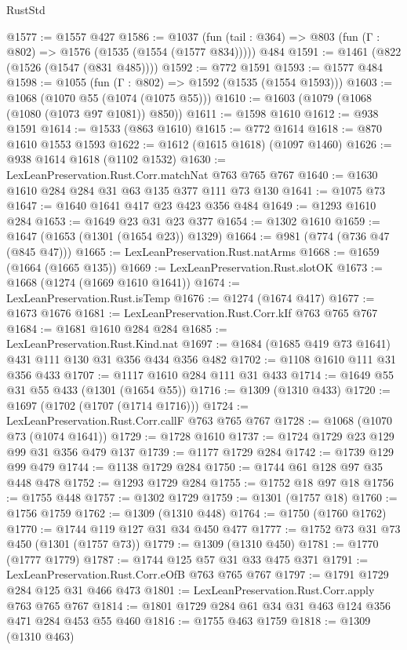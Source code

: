 \begin{lexlean}{RustStd}
\begin{coremodule}
@1577 := @1557 @427
@1586 := @1037
    (fun (tail : @364) => @803 (fun (Γ : @802) => @1576 (@1535 (@1554 (@1577 @834)))))
    @484
@1591 := @1461 (@822 (@1526 (@1547 (@831 @485))))
@1592 := @772 @1591
@1593 := @1577 @484
@1598 := @1055 (fun (Γ : @802) => @1592 (@1535 (@1554 @1593)))
@1603 := @1068 (@1070 @55 (@1074 (@1075 @55)))
@1610 := @1603 (@1079 (@1068 (@1080 (@1073 @97 @1081)) @850))
@1611 := @1598 @1610
@1612 := @938 @1591
@1614 := @1533 (@863 @1610)
@1615 := @772 @1614
@1618 := @870 @1610 @1553 @1593
@1622 := @1612 (@1615 @1618) (@1097 @1460)
@1626 := @938 @1614 @1618 (@1102 @1532)
@1630 := LexLeanPreservation.Rust.Corr.matchNat @763 @765 @767
@1640 := @1630 @1610 @284 @284 @31 @63 @135 @377 @111 @73 @130
@1641 := @1075 @73
@1647 := @1640 @1641 @417 @23 @423 @356 @484
@1649 := @1293 @1610 @284
@1653 := @1649 @23 @31 @23 @377
@1654 := @1302 @1610
@1659 := @1647 (@1653 (@1301 (@1654 @23)) @1329)
@1664 := @981 (@774 (@736 @47 (@845 @47)))
@1665 := LexLeanPreservation.Rust.natArms
@1668 := @1659 (@1664 (@1665 @135))
@1669 := LexLeanPreservation.Rust.slotOK
@1673 := @1668 (@1274 (@1669 @1610 @1641))
@1674 := LexLeanPreservation.Rust.isTemp
@1676 := @1274 (@1674 @417)
@1677 := @1673 @1676
@1681 := LexLeanPreservation.Rust.Corr.kIf @763 @765 @767
@1684 := @1681 @1610 @284 @284
@1685 := LexLeanPreservation.Rust.Kind.nat
@1697 := @1684 (@1685 @419 @73 @1641) @431 @111 @130 @31 @356 @434 @356 @482
@1702 := @1108 @1610 @111 @31 @356 @433
@1707 := @1117 @1610 @284 @111 @31 @433
@1714 := @1649 @55 @31 @55 @433 (@1301 (@1654 @55))
@1716 := @1309 (@1310 @433)
@1720 := @1697 (@1702 (@1707 (@1714 @1716)))
@1724 := LexLeanPreservation.Rust.Corr.callF @763 @765 @767
@1728 := @1068 (@1070 @73 (@1074 @1641))
@1729 := @1728 @1610
@1737 := @1724 @1729 @23 @129 @99 @31 @356 @479 @137
@1739 := @1177 @1729 @284
@1742 := @1739 @129 @99 @479
@1744 := @1138 @1729 @284
@1750 := @1744 @61 @128 @97 @35 @448 @478
@1752 := @1293 @1729 @284
@1755 := @1752 @18 @97 @18
@1756 := @1755 @448
@1757 := @1302 @1729
@1759 := @1301 (@1757 @18)
@1760 := @1756 @1759
@1762 := @1309 (@1310 @448)
@1764 := @1750 (@1760 @1762)
@1770 := @1744 @119 @127 @31 @34 @450 @477
@1777 := @1752 @73 @31 @73 @450 (@1301 (@1757 @73))
@1779 := @1309 (@1310 @450)
@1781 := @1770 (@1777 @1779)
@1787 := @1744 @125 @57 @31 @33 @475 @371
@1791 := LexLeanPreservation.Rust.Corr.eOfB @763 @765 @767
@1797 := @1791 @1729 @284 @125 @31 @466 @473
@1801 := LexLeanPreservation.Rust.Corr.apply @763 @765 @767
@1814 := @1801 @1729 @284 @61 @34 @31 @463 @124 @356 @471 @284 @453 @55 @460
@1816 := @1755 @463 @1759
@1818 := @1309 (@1310 @463)

\end{coremodule}
\end{lexlean}
